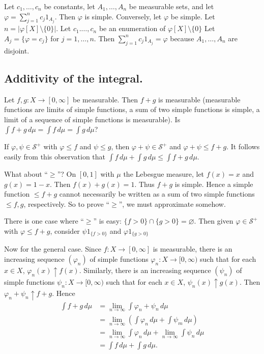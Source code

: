 \documentclass{article}
\theoremstyle{definition}
\begin{document}
Let $c_1, \ldots, c_n$ be constants, let $A_1, \ldots, A_n$ be measurable sets, and let $\varphi = \sum_{j=1}^n c_j 1_{A_j}$. Then $\varphi$ is simple. Conversely, let $\varphi$ be simple. Let $n = |\varphi[X] \setminus \{0\}|$. Let $c_1. \ldots, c_n$ be an enumeration of $\varphi[X]\setminus\{0\}$ Let $A_j = \{\varphi = c_j\}$ for $j = 1, \ldots, n$. Then $\sum_{j=1}^n c_j 1_{A_j} = \varphi$ because $A_1, \ldots, A_n$ are disjoint.

\subsection*{Additivity of the integral.}

Let $f, g: X\longrightarrow [0, \infty]$ be measurable. Then $f + g$ is measurable (measurable functions are limits of simple functions, a sum of two simple functions is simple, a limit of a sequence of simple functions is measurable). Is $\int f + g\,d\mu = \int f\,d\mu = \int g\,d\mu$?

If $\varphi, \psi \in \mathscr{S}^+$ with $\varphi \leq f$ and $\psi \leq g$, then $\varphi + \psi \in \mathscr{S}^+$ and $\varphi + \psi \leq f + g$. It follows easily from this observation that $\int f\,d\mu + \int g\,d\mu \leq \int f + g \,d\mu$.

What about ``$\geq$''? On $[0, 1]$ with $\mu$ the Lebesgue measure, let $f(x)= x$ and $g(x) = 1 - x$. Then $f(x) + g(x) = 1$. Thus $f + g$ is simple. Hence a simple function $\leq f + g$ cannot necessarily be written as a sum of two simple functions $\leq f, g$, respectively. So to prove ``$\geq$'', we must approximate somehow.

There is one case where ``$\geq$'' is easy: $\{f > 0\} \cap \{g > 0\} = \varnothing$. Then given $\varphi \in \mathscr{S}^+$ with $\varphi \leq f + g$, consider $\psi 1_{\{f > 0\}}$ and $\varphi 1_{\{g > 0\}}$

Now for the general case. Since $f: X \longrightarrow [0, \infty]$ is measurable, there is an increasing sequence $(\varphi_n)$ of simple functions $\varphi_n: X \longrightarrow [0, \infty)$ such that for each $x \in X$, $\varphi_n(x) \uparrow f(x)$. Similarly, there is an increasing sequence $(\psi_n)$ of simple functions $\psi_n: X \longrightarrow [0, \infty)$ such that for each $x \in X$, $\psi_n(x) \uparrow g(x)$.
Then $\varphi_n + \psi_n \uparrow f + g$. Hence
\begin{align*}
    \int f + g\,d\mu &= \lim_{n\to\infty} \int \varphi_n + \psi_n \,d\mu \tag{MCT}\\
    &= \lim_{n\to\infty} \left( \int \varphi_n\,d\mu + \int \psi_m\,d\mu \right) \tag{$\varphi, \psi$ are simple}\\
    &= \lim_{n\to\infty} \int \varphi_n\,d\mu + \lim_{n\to\infty} \int \psi_n\,d\mu \tag{since both limits exist} \\
    &= \int f\,d\mu + \int g\,d\mu. \tag{MCT}
\end{align*}
\end{document}
